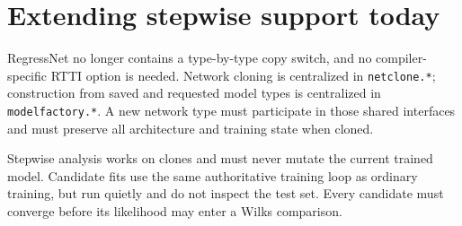 \documentclass{report}
\begin{document}
\section{Extending stepwise support today}\label{regresscode}

RegressNet no longer contains a type-by-type copy switch, and no
compiler-specific RTTI option is needed.  Network cloning is
centralized in \texttt{netclone.*}; construction from saved and
requested model types is centralized in \texttt{modelfactory.*}.
A new network type must participate in those shared interfaces and
must preserve all architecture and training state when cloned.

Stepwise analysis works on clones and must never mutate the current
trained model.  Candidate fits use the same authoritative training
loop as ordinary training, but run quietly and do not inspect the test
set.  Every candidate must converge before its likelihood may enter a
Wilks comparison.




\printindex
\end{document}
